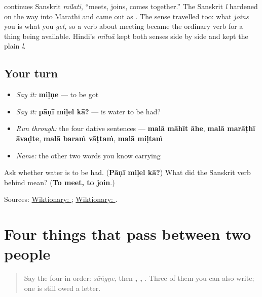 \begin{cousinweb}
\textbf{} continues Sanskrit \textbf{} \emph{milati}, \textquotedblleft{}meets, joins, comes together.\textquotedblright{} The Sanskrit \emph{l} hardened on the way into Marathi and came out as \textbf{}. The sense travelled too: what \emph{joins} you is what you \emph{get}, so a verb about meeting became the ordinary verb for a thing being available. Hindi's \textbf{} \emph{milnā} kept both senses side by side and kept the plain \emph{l}.
\end{cousinweb}

\subsection*{Your turn}
\begin{itemize}
\raggedright
  \item \emph{Say it:} \textbf{miḷṇe} — to be got
  \item \emph{Say it:} \textbf{pāṇī miḷel kā?} — is water to be had?
  \item \emph{Run through:} the four dative sentences — \textbf{malā māhīt āhe}, \textbf{malā marāṭhī āvaḍte}, \textbf{malā baraṁ vāṭtaṁ}, \textbf{malā miḷtaṁ}
  \item \emph{Name:} the other two words you know carrying \textbf{}
\end{itemize}

\begin{tcolorbox}[breakable,colback=teal!4,colframe=teal!35!black,title={Before you move on}]
Ask whether water is to be had. (\textbf{Pāṇī miḷel kā?}) What did the Sanskrit verb behind \textbf{} mean? (\textbf{To meet, to join}.)

Sources: \href{https://en.wiktionary.org/wiki/\%E0\%A4\%AE\%E0\%A4\%BF\%E0\%A4\%B3\%E0\%A4\%A3\%E0\%A5\%87}{Wiktionary: }; \href{https://en.wiktionary.org/wiki/\%E0\%A4\%AE\%E0\%A4\%BF\%E0\%A4\%B2\%E0\%A4\%A4\%E0\%A4\%BF}{Wiktionary: }.
\end{tcolorbox}
\section[mhaṇṇe / shikṇe / miḷṇe]{Four things that pass between two people}

\label{lesson:MR-R24-passing-verbs}



\begin{quote}
Say the four in order: \emph{sāṅgṇe}, then \textbf{, , }. Three of them you can also write; one is still owed a letter.
\end{quote}

